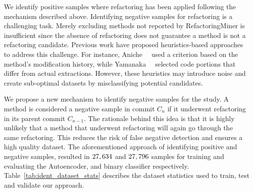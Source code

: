 We identify positive samples where \exm{} refactoring has been applied following the mechanism described above.
Identifying negative samples for \exm{} refactoring is a challenging task. Merely excluding methods not reported by RefactoringMiner is insufficient since the absence of refactoring does not guarantee a method is not a refactoring candidate. Previous work have proposed heuristics-based approaches to address this challenge. For instance, Aniche~\etal{}~\cite{Aniche2020Effectiveness} used a criterion based on the method's modification history, while Yamanaka~\etal{}~\cite{Yamanaka2021RecommendingEM} selected code portions that differ from actual extractions. 
However, these heuristics may introduce noise and create sub-optimal datasets by misclassifying potential \exm{} candidates.

We propose a new mechanism to identify negative samples for the study. A method is considered a negative sample in commit $C_{n}$ if it underwent \exm{} refactoring in its parent commit $C_{n-1}$.  
The rationale behind this idea is that it is highly unlikely that a method that underwent \exm{} refactoring will again go through the same refactoring. This reduces the risk of false negative detection and ensures a high quality dataset. 
The aforementioned approach of identifying positive and negative samples, resulted in $27\small,634$ and $27\small,796$ samples for training and evaluating the Autoencoder, and  binary classifier respectively. Table~\ref{tab:ident_dataset_stats} describes the dataset statistics used to train, test and validate our approach.


